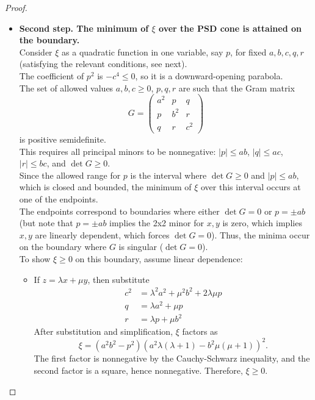 \documentclass[a4paper,10pt]{article}
\theoremstyle{plain}
\theoremstyle{definition}
\theoremstyle{remark}
\begin{document}
\begin{proof}
\begin{itemize}
\item \textbf{Second step. The minimum of $\xi$ over the PSD cone is attained on the boundary.} \\
Consider $\xi$ as a quadratic function in one variable, say $p$, for fixed $a, b, c, q, r$ (satisfying the relevant conditions, see next). \\ 
The coefficient of $p^2$ is $-c^4 \leq 0$, so it is a downward-opening parabola. \\
The set of allowed values $a, b, c \geq 0$, $p, q, r$ are such that the Gram matrix
\[
G = \begin{pmatrix}
a^2 & p & q \\
p & b^2 & r \\
q & r & c^2
\end{pmatrix}
\]
is positive semidefinite. \\
This requires all principal minors to be nonnegative: $|p| \leq ab$, $|q| \leq ac$, $|r| \leq bc$, and $\det G \geq 0$. \\
Since the allowed range for $p$ is the interval where $\det G \geq 0$ and $|p| \leq ab$, which is closed and bounded, the minimum of $\xi$ over this interval occurs at one of the endpoints. \\
The endpoints correspond to boundaries where either $\det G = 0$ or $p = \pm ab$ (but note that $p = \pm ab$ implies the 2x2 minor for $x,y$ is zero, which implies $x,y$ are linearly dependent, which forces $\det G = 0$). Thus, the minima occur on the boundary where $G$ is singular ($\det G = 0$). \\
To show $\xi \geq 0$ on this boundary, assume linear dependence:
\begin{itemize}
\item If $z = \lambda x + \mu y$, then substitute
\begin{align*}
c^2 &= \lambda^2 a^2 + \mu^2 b^2 + 2 \lambda \mu p \\
q &= \lambda a^2 + \mu p \\
r &= \lambda p + \mu b^2
\end{align*}
After substitution and simplification, $\xi$ factors as
\[ \xi = (a^2 b^2 - p^2) \left( a^2 \lambda (\lambda + 1) - b^2 \mu (\mu + 1) \right)^2. \]
The first factor is nonnegative by the Cauchy-Schwarz inequality, and the second factor is a square, hence nonnegative. Therefore, $\xi \geq 0$.


\end{itemize}
\end{itemize}
\end{proof}
\end{document}
